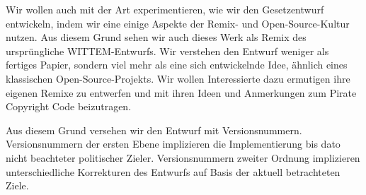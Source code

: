 Wir wollen auch mit der Art experimentieren, wie wir den Gesetzentwurf entwickeln, indem wir eine einige Aspekte der Remix- und Open-Source-Kultur nutzen. Aus diesem Grund sehen wir auch dieses Werk als Remix des ursprüngliche WITTEM-Entwurfs. Wir verstehen den Entwurf weniger als fertiges Papier, sondern viel mehr als eine sich entwickelnde Idee, ähnlich eines klassischen Open-Source-Projekts. Wir wollen Interessierte dazu ermutigen ihre eigenen Remixe zu entwerfen und mit ihren Ideen und Anmerkungen zum Pirate Copyright Code beizutragen.  


Aus diesem Grund versehen wir den Entwurf mit Versionsnummern. Versionsnummern der ersten Ebene implizieren die Implementierung bis dato nicht beachteter politischer Zieler. Versionsnummern zweiter Ordnung implizieren unterschiedliche Korrekturen des Entwurfs auf Basis der aktuell betrachteten Ziele. 
